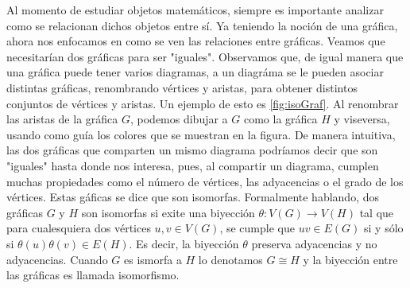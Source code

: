 Al momento de estudiar objetos matem\'aticos, siempre es importante analizar
como se relacionan dichos objetos entre s\'i. Ya teniendo la noci\'on de una
gr\'afica, ahora nos enfocamos en como se ven las relaciones entre gr\'aficas.
Veamos que necesitar\'ian dos gr\'aficas para ser "iguales". Observamos que, de
igual manera que una gr\'afica puede tener varios diagramas, a un diagr\'ama se
le pueden asociar distintas gr\'aficas, renombrando v\'ertices y aristas, para
obtener distintos conjuntos de v\'ertices y aristas. Un ejemplo de esto es
\cref{fig:isoGraf}. Al renombrar las aristas de la gr\'afica $G$, podemos
dibujar a $G$ como la gr\'afica $H$ y viseversa, usando como gu\'ia los colores
que se muestran en la figura. De manera intuitiva, las dos gr\'aficas que
comparten un mismo diagrama podr\'iamos decir que son "iguales" hasta donde nos
interesa, pues, al compartir un diagrama, cumplen muchas propiedades como el
n\'umero de v\'ertices, las adyacencias o el grado de los v\'ertices. Estas
g\'aficas se dice que son isomorfas. Formalmente hablando, dos gr\'aficas $G$ y
$H$ son isomorfas si exite una biyecci\'on $\theta: V(G) \rightarrow V(H)$ tal
que para cualesquiera dos v\'ertices $u, v \in V(G)$, se cumple que $uv \in
E(G)$ si y s\'olo si $\theta(u)\theta(v) \in E(H)$. Es decir, la biyecci\'on
$\theta$ preserva adyacencias y no adyacencias. Cuando $G$ es ismorfa a $H$ lo
denotamos $G \cong H$ y la biyecci\'on entre las gr\'aficas es llamada
isomorfismo.

